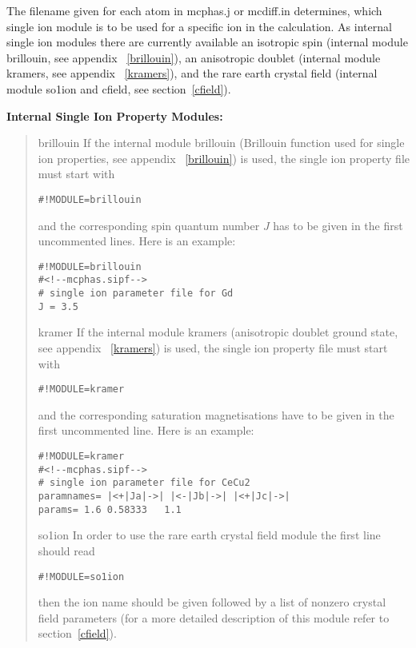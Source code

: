 The filename given for each atom in {\prg mcphas.j}
or {\prg mcdiff.in} determines, which single ion module 
is to be used for a specific ion in the calculation.
As internal single ion modules there are currently available an isotropic spin (internal module {\prg brillouin}, %
see
appendix ~\ref{brillouin}), an 
 anisotropic doublet (internal module {\prg kramers}, see appendix ~\ref{kramers}), 
and the rare earth crystal field (internal module {\prg so1ion} and
cfield, see section~\ref{cfield}).

\vspace{0.5cm} 
{\bf Internal Single Ion Property Modules:} 
\begin{quote}
\item[{\prg brillouin}]
If the internal module {\prg brillouin}
 (Brillouin function used for single ion properties,
  see appendix ~\ref{brillouin}) is used,
the single ion property file must start with
\begin{verbatim}#!MODULE=brillouin\end{verbatim} and
the corresponding spin
 quantum number $J$ has to be given in the first uncommented
lines.
Here is an example:
\begin{verbatim}
#!MODULE=brillouin
#<!--mcphas.sipf-->
# single ion parameter file for Gd
J = 3.5
\end{verbatim}
\item [{\prg kramer}] If the internal module {\prg kramers} (anisotropic doublet ground state, see appendix %
~\ref{kramers}) is used,
the single ion property file must start with
\begin{verbatim}#!MODULE=kramer\end{verbatim} and
the corresponding saturation magnetisations have to be given in the first uncommented
line.
Here is an example:
\begin{verbatim}
#!MODULE=kramer
#<!--mcphas.sipf-->
# single ion parameter file for CeCu2
paramnames= |<+|Ja|->| |<-|Jb|->| |<+|Jc|->|
params= 1.6 0.58333   1.1
\end{verbatim}
\item[{\prg so1ion\index{so1ion}}]In order to use the rare earth crystal field module the first line should read
\begin{verbatim}#!MODULE=so1ion\end{verbatim}

then the ion name should be given followed by a list of nonzero crystal field parameters
(for a more detailed description of this module refer to section~\ref{cfield}).


\end{quote}
